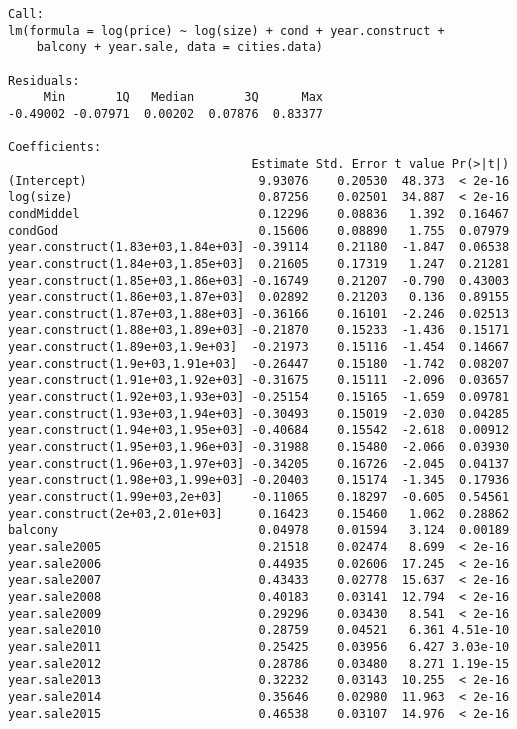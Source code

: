 \begin{lstlisting}
Call:
lm(formula = log(price) ~ log(size) + cond + year.construct + 
    balcony + year.sale, data = cities.data)

Residuals:
     Min       1Q   Median       3Q      Max 
-0.49002 -0.07971  0.00202  0.07876  0.83377 

Coefficients:
                                  Estimate Std. Error t value Pr(>|t|)
(Intercept)                        9.93076    0.20530  48.373  < 2e-16
log(size)                          0.87256    0.02501  34.887  < 2e-16
condMiddel                         0.12296    0.08836   1.392  0.16467
condGod                            0.15606    0.08890   1.755  0.07979
year.construct(1.83e+03,1.84e+03] -0.39114    0.21180  -1.847  0.06538
year.construct(1.84e+03,1.85e+03]  0.21605    0.17319   1.247  0.21281
year.construct(1.85e+03,1.86e+03] -0.16749    0.21207  -0.790  0.43003
year.construct(1.86e+03,1.87e+03]  0.02892    0.21203   0.136  0.89155
year.construct(1.87e+03,1.88e+03] -0.36166    0.16101  -2.246  0.02513
year.construct(1.88e+03,1.89e+03] -0.21870    0.15233  -1.436  0.15171
year.construct(1.89e+03,1.9e+03]  -0.21973    0.15116  -1.454  0.14667
year.construct(1.9e+03,1.91e+03]  -0.26447    0.15180  -1.742  0.08207
year.construct(1.91e+03,1.92e+03] -0.31675    0.15111  -2.096  0.03657
year.construct(1.92e+03,1.93e+03] -0.25154    0.15165  -1.659  0.09781
year.construct(1.93e+03,1.94e+03] -0.30493    0.15019  -2.030  0.04285
year.construct(1.94e+03,1.95e+03] -0.40684    0.15542  -2.618  0.00912
year.construct(1.95e+03,1.96e+03] -0.31988    0.15480  -2.066  0.03930
year.construct(1.96e+03,1.97e+03] -0.34205    0.16726  -2.045  0.04137
year.construct(1.98e+03,1.99e+03] -0.20403    0.15174  -1.345  0.17936
year.construct(1.99e+03,2e+03]    -0.11065    0.18297  -0.605  0.54561
year.construct(2e+03,2.01e+03]     0.16423    0.15460   1.062  0.28862
balcony                            0.04978    0.01594   3.124  0.00189
year.sale2005                      0.21518    0.02474   8.699  < 2e-16
year.sale2006                      0.44935    0.02606  17.245  < 2e-16
year.sale2007                      0.43433    0.02778  15.637  < 2e-16
year.sale2008                      0.40183    0.03141  12.794  < 2e-16
year.sale2009                      0.29296    0.03430   8.541  < 2e-16
year.sale2010                      0.28759    0.04521   6.361 4.51e-10
year.sale2011                      0.25425    0.03956   6.427 3.03e-10
year.sale2012                      0.28786    0.03480   8.271 1.19e-15
year.sale2013                      0.32232    0.03143  10.255  < 2e-16
year.sale2014                      0.35646    0.02980  11.963  < 2e-16
year.sale2015                      0.46538    0.03107  14.976  < 2e-16
                                     

\end{lstlisting}
